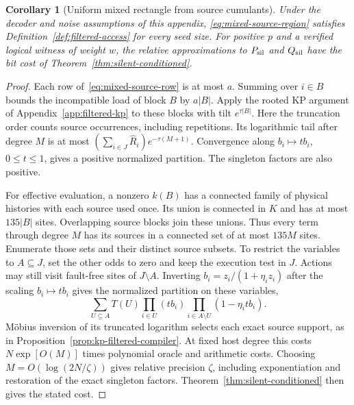 \documentclass[10pt,twocolumn]{article}
\newtheorem{corollary}[theorem]{Corollary}
\theoremstyle{definition}
\begin{document}
\begin{corollary}[Uniform mixed rectangle from source cumulants]
\label{cor:mixed-source-cumulants}
Under the decoder and noise assumptions of this appendix,
\eqref{eq:mixed-source-region} satisfies
Definition~\ref{def:filtered-access} for every seed size. For positive
$p$ and a verified logical witness of weight $w$, the relative
approximations to $P_{\rm sil}$ and $Q_{\rm sil}$ have the bit cost
of Theorem~\ref{thm:silent-conditioned}.
\end{corollary}
\begin{proof}
Each row of~\eqref{eq:mixed-source-row} is at most $a$. Summing
over $i\in B$ bounds the incompatible load of block $B$ by $a|B|$.
Apply the rooted KP argument of Appendix~\ref{app:filtered-kp} to
these blocks with tilt $e^{\tau|B|}$. Here the truncation order counts
source occurrences, including repetitions. Its logarithmic tail after
degree $M$ is at most $(\sum_{i\in J}\widehat R_i)e^{-\tau(M+1)}$.
Convergence along $b_i\mapsto t b_i$, $0\le t\le1$, gives a positive
normalized partition. The singleton factors are also positive.

For effective evaluation, a nonzero $k(B)$ has a connected family of
physical histories with each source used once. Its union is connected
in $K$ and has at most $135|B|$ sites. Overlapping source blocks join
these unions. Thus every term through degree $M$ has its sources in a
connected set of at most $135M$ sites. Enumerate those sets and their
distinct source subsets. To restrict the variables to $A\subseteq J$,
set the other odds to zero and keep the execution test in $J$. Actions
may still visit fault-free sites of $J\setminus A$. Inverting
$b_i=z_i/(1+\eta_i z_i)$ after the scaling $b_i\mapsto t b_i$ gives
the normalized partition on these variables,
\[
 \sum_{U\subseteq A}T(U)\prod_{i\in U}(t b_i)
                       \prod_{i\in A\setminus U}(1-\eta_i t b_i).
\]
M\"obius inversion of its truncated logarithm selects each exact
source support, as in Proposition~\ref{prop:kp-filtered-compiler}.
At fixed host degree this costs $N\exp[O(M)]$ times polynomial oracle
and arithmetic costs. Choosing $M=O(\log(2N/\zeta))$ gives relative
precision $\zeta$, including exponentiation and restoration of the
exact singleton factors. Theorem~\ref{thm:silent-conditioned} then
gives the stated cost.
\end{proof}
\end{document}
